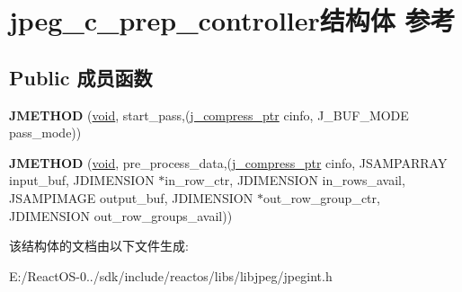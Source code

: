 \hypertarget{structjpeg__c__prep__controller}{}\section{jpeg\+\_\+c\+\_\+prep\+\_\+controller结构体 参考}
\label{structjpeg__c__prep__controller}
\subsection*{Public 成员函数}
\begin{DoxyCompactItemize}
\item 
\mbox{\label{structjpeg__c__prep__controller_af2fb43bbf035ffe6b1a28fb2382db63d}} 
{\bfseries J\+M\+E\+T\+H\+OD} (\hyperlink{interfacevoid}{void}, start\+\_\+pass,(\hyperlink{structjpeg__compress__struct}{j\+\_\+compress\+\_\+ptr} cinfo, J\+\_\+\+B\+U\+F\+\_\+\+M\+O\+DE pass\+\_\+mode))
\item 
\mbox{\label{structjpeg__c__prep__controller_a84100e06666ea90e6734dce2a10af554}} 
{\bfseries J\+M\+E\+T\+H\+OD} (\hyperlink{interfacevoid}{void}, pre\+\_\+process\+\_\+data,(\hyperlink{structjpeg__compress__struct}{j\+\_\+compress\+\_\+ptr} cinfo, J\+S\+A\+M\+P\+A\+R\+R\+AY input\+\_\+buf, J\+D\+I\+M\+E\+N\+S\+I\+ON $\ast$in\+\_\+row\+\_\+ctr, J\+D\+I\+M\+E\+N\+S\+I\+ON in\+\_\+rows\+\_\+avail, J\+S\+A\+M\+P\+I\+M\+A\+GE output\+\_\+buf, J\+D\+I\+M\+E\+N\+S\+I\+ON $\ast$out\+\_\+row\+\_\+group\+\_\+ctr, J\+D\+I\+M\+E\+N\+S\+I\+ON out\+\_\+row\+\_\+groups\+\_\+avail))
\end{DoxyCompactItemize}


该结构体的文档由以下文件生成\+:\begin{DoxyCompactItemize}
\item 
E\+:/\+React\+O\+S-\/0../sdk/include/reactos/libs/libjpeg/jpegint.\+h\end{DoxyCompactItemize}
